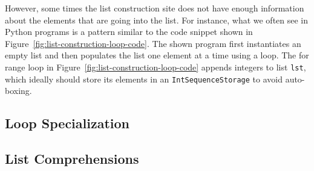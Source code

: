 However, some times the list construction site does not have enough information about the elements that are going into the list.
For instance, what we often see in Python programs is a pattern similar to the code snippet shown in Figure~\ref{fig:list-construction-loop-code}.
The shown program first instantiates an empty list and then populates the list one element at a time using a loop.
The for range loop in Figure~\ref{fig:list-construction-loop-code} appends integers to list \texttt{lst}, which ideally should store its elements in an \texttt{IntSequenceStorage} to avoid auto-boxing.


\subsection{Loop Specialization}

\subsection{List Comprehensions}
